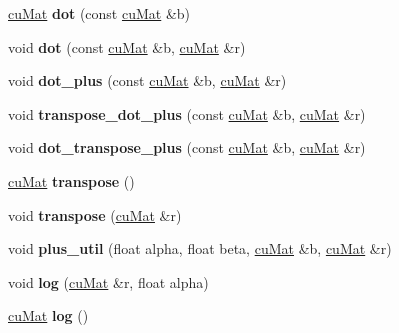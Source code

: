 \begin{DoxyCompactItemize}
\mbox{\hyperlink{classcuMat}{cu\+Mat}} {\bfseries dot} (const \mbox{\hyperlink{classcuMat}{cu\+Mat}} \&b)
\item 
\mbox{\label{classcuMat_ad599cffb1db479d5b5e6680037c5bb28}} 
void {\bfseries dot} (const \mbox{\hyperlink{classcuMat}{cu\+Mat}} \&b, \mbox{\hyperlink{classcuMat}{cu\+Mat}} \&r)
\item 
\mbox{\label{classcuMat_ac903f062064bf0a72817b08052fe039b}} 
void {\bfseries dot\+\_\+plus} (const \mbox{\hyperlink{classcuMat}{cu\+Mat}} \&b, \mbox{\hyperlink{classcuMat}{cu\+Mat}} \&r)
\item 
\mbox{\label{classcuMat_a83c9065ea81766b36e487a8248f97b3c}} 
void {\bfseries transpose\+\_\+dot\+\_\+plus} (const \mbox{\hyperlink{classcuMat}{cu\+Mat}} \&b, \mbox{\hyperlink{classcuMat}{cu\+Mat}} \&r)
\item 
\mbox{\label{classcuMat_ad57413e2e6b7003372df1e57651e07cf}} 
void {\bfseries dot\+\_\+transpose\+\_\+plus} (const \mbox{\hyperlink{classcuMat}{cu\+Mat}} \&b, \mbox{\hyperlink{classcuMat}{cu\+Mat}} \&r)
\item 
\mbox{\label{classcuMat_a9c672e0bd2c35f1fe4ac87e2b5906cf1}} 
\mbox{\hyperlink{classcuMat}{cu\+Mat}} {\bfseries transpose} ()
\item 
\mbox{\label{classcuMat_af18bcf7a8b627c9dbd69ebf52177c4b8}} 
void {\bfseries transpose} (\mbox{\hyperlink{classcuMat}{cu\+Mat}} \&r)
\item 
\mbox{\label{classcuMat_a8b7c00520a2c174c5e5017c42e60d264}} 
void {\bfseries plus\+\_\+util} (float alpha, float beta, \mbox{\hyperlink{classcuMat}{cu\+Mat}} \&b, \mbox{\hyperlink{classcuMat}{cu\+Mat}} \&r)
\item 
\mbox{\label{classcuMat_a059b9130f833b2d18fb7da5caac04376}} 
void {\bfseries log} (\mbox{\hyperlink{classcuMat}{cu\+Mat}} \&r, float alpha)
\item 
\mbox{\label{classcuMat_a1407cf01332386a714e98d6124503aac}} 
\mbox{\hyperlink{classcuMat}{cu\+Mat}} {\bfseries log} ()
\item 
\mbox{\label{classcuMat_a436480b335debb4831fd93d071f5dde6}} 

\end{DoxyCompactItemize}
